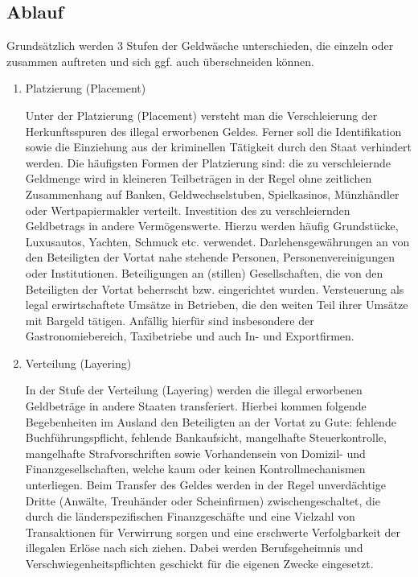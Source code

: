 \documentclass{article}
\begin{document}
        \subsection[Ablauf]{Ablauf}

                Grundsätzlich werden 3 Stufen der Geldwäsche unterschieden, die einzeln oder zusammen auftreten und sich ggf. auch überschneiden können.

                \begin{enumerate}

                    \item Platzierung (Placement)

                        Unter der Platzierung (Placement) versteht man die Verschleierung der Herkunftsspuren des illegal erworbenen Geldes. Ferner soll die Identifikation sowie die Einziehung aus der kriminellen Tätigkeit durch den Staat verhindert werden. Die häufigsten Formen der Platzierung sind:
                        die zu verschleiernde Geldmenge wird in kleineren Teilbeträgen in der Regel ohne zeitlichen Zusammenhang auf Banken, Geldwechselstuben, Spielkasinos, Münzhändler oder Wertpapiermakler verteilt.
                        Investition des zu verschleiernden Geldbetrags in andere Vermögenswerte. Hierzu werden häufig Grundstücke, Luxusautos, Yachten, Schmuck etc. verwendet.
                        Darlehensgewährungen an von den Beteiligten der Vortat nahe stehende Personen, Personenvereinigungen oder Institutionen.
                        Beteiligungen an (stillen) Gesellschaften, die von den Beteiligten der Vortat beherrscht bzw. eingerichtet wurden.
                        Versteuerung als legal erwirtschaftete Umsätze in Betrieben, die den weiten Teil ihrer Umsätze mit Bargeld tätigen. Anfällig hierfür sind insbesondere der Gastronomiebereich, Taxibetriebe und auch In- und Exportfirmen.

                    \item Verteilung (Layering)

                        In der Stufe der Verteilung (Layering) werden die illegal erworbenen Geldbeträge in andere Staaten transferiert. Hierbei kommen folgende Begebenheiten im Ausland den Beteiligten an der Vortat zu Gute:
                        fehlende Buchführungspflicht,
                        fehlende Bankaufsicht,
                        mangelhafte Steuerkontrolle,
                        mangelhafte Strafvorschriften sowie
                        Vorhandensein von Domizil- und Finanzgesellschaften, welche kaum oder keinen Kontrollmechanismen unterliegen.
                        Beim Transfer des Geldes werden in der Regel unverdächtige Dritte (Anwälte, Treuhänder oder Scheinfirmen) zwischengeschaltet, die durch die länderspezifischen Finanzgeschäfte und eine Vielzahl von Transaktionen für Verwirrung sorgen und eine erschwerte Verfolgbarkeit der illegalen Erlöse nach sich ziehen. Dabei werden Berufsgeheimnis und Verschwiegenheitspflichten geschickt für die eigenen Zwecke eingesetzt.


\end{enumerate}
\end{document}
